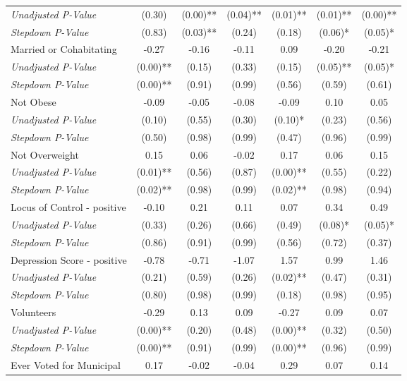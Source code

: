 \begin{tabular}{l c c c c c c}
\quad \textit{Unadjusted P-Value} & (0.30) & (0.00)** & (0.04)** & (0.01)** & (0.01)** & (0.00)** \\
\quad \textit{Stepdown P-Value} & (0.83) & (0.03)** & (0.24) & (0.18) & (0.06)* & (0.05)* \\
Married or Cohabitating & -0.27 & -0.16 & -0.11 & 0.09 & -0.20 & -0.21 \\
\quad \textit{Unadjusted P-Value} & (0.00)** & (0.15) & (0.33) & (0.15) & (0.05)** & (0.05)* \\
\quad \textit{Stepdown P-Value} & (0.00)** & (0.91) & (0.99) & (0.56) & (0.59) & (0.61) \\
Not Obese & -0.09 & -0.05 & -0.08 & -0.09 & 0.10 & 0.05 \\
\quad \textit{Unadjusted P-Value} & (0.10) & (0.55) & (0.30) & (0.10)* & (0.23) & (0.56) \\
\quad \textit{Stepdown P-Value} & (0.50) & (0.98) & (0.99) & (0.47) & (0.96) & (0.99) \\
Not Overweight & 0.15 & 0.06 & -0.02 & 0.17 & 0.06 & 0.15 \\
\quad \textit{Unadjusted P-Value} & (0.01)** & (0.56) & (0.87) & (0.00)** & (0.55) & (0.22) \\
\quad \textit{Stepdown P-Value} & (0.02)** & (0.98) & (0.99) & (0.02)** & (0.98) & (0.94) \\
Locus of Control - positive & -0.10 & 0.21 & 0.11 & 0.07 & 0.34 & 0.49 \\
\quad \textit{Unadjusted P-Value} & (0.33) & (0.26) & (0.66) & (0.49) & (0.08)* & (0.05)* \\
\quad \textit{Stepdown P-Value} & (0.86) & (0.91) & (0.99) & (0.56) & (0.72) & (0.37) \\
Depression Score - positive & -0.78 & -0.71 & -1.07 & 1.57 & 0.99 & 1.46 \\
\quad \textit{Unadjusted P-Value} & (0.21) & (0.59) & (0.26) & (0.02)** & (0.47) & (0.31) \\
\quad \textit{Stepdown P-Value} & (0.80) & (0.98) & (0.99) & (0.18) & (0.98) & (0.95) \\
Volunteers & -0.29 & 0.13 & 0.09 & -0.27 & 0.09 & 0.07 \\
\quad \textit{Unadjusted P-Value} & (0.00)** & (0.20) & (0.48) & (0.00)** & (0.32) & (0.50) \\
\quad \textit{Stepdown P-Value} & (0.00)** & (0.91) & (0.99) & (0.00)** & (0.96) & (0.99) \\
Ever Voted for Municipal & 0.17 & -0.02 & -0.04 & 0.29 & 0.07 & 0.14 \\

\end{tabular}
